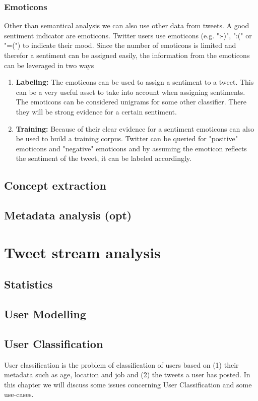 \documentclass{article}
\begin{document}
\subsubsection{Emoticons}
Other than semantical analysis we can also use other data from tweets. A good sentiment indicator are emoticons. Twitter users use emoticons (e.g. ":-)", ":(" or "=(") to indicate their mood.\cite{twitterSentiment} Since the number of emoticons is limited and therefor a sentiment can be assigned easily, the information from the emoticons can be leveraged in two ways
\begin{enumerate}
\item \textbf{Labeling:} The emoticons can be used to assign a sentiment to a tweet. This can be a very useful asset to take into account when assigning sentiments. The emoticons can be considered unigrams for some other classifier. There they will be strong evidence for a certain sentiment.
\item \textbf{Training:} Because of their clear evidence for a sentiment emoticons can also be used to build a training corpus. Twitter can be queried for "positive" emoticons and "negative" emoticons and by assuming the emoticon reflects the sentiment of the tweet, it can be labeled accordingly.\cite{moodLens} 
\end{enumerate}


\subsection{Concept extraction}
\subsection{Metadata analysis (opt)}

\section{Tweet stream analysis}
\subsection{Statistics}
\subsection{User Modelling}
\subsection{User Classification}
User classification is the problem of classification of users based on (1) their metadata such as age, location and job and (2) the tweets a user has posted. In this chapter we will discuss some issues concerning User Classification and some use-cases. 
\end{document}
